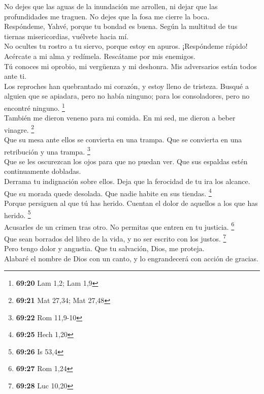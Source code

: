  No dejes que las aguas de la inundación me arrollen, ni
dejar que las profundidades me traguen. No dejes que la fosa me cierre
la boca.\\
 Respóndeme, Yahvé, porque tu bondad es buena. Según la
multitud de tus tiernas misericordias, vuélvete hacia mí.\\
 No ocultes tu rostro a tu siervo, porque estoy en
apuros. ¡Respóndeme rápido!\\
 Acércate a mi alma y redímela. Rescátame por mis
enemigos.\\
 Tú conoces mi oprobio, mi vergüenza y mi deshonra. Mis
adversarios están todos ante ti.\\
 Los reproches han quebrantado mi corazón, y estoy lleno
de tristeza. Busqué a alguien que se apiadara, pero no había ninguno;
para los consoladores, pero no encontré ninguno. \footnote{\textbf{69:20}
  Lam 1,2; Lam 1,9}\\
 También me dieron veneno para mi comida. En mi sed, me
dieron a beber vinagre. \footnote{\textbf{69:21} Mat 27,34; Mat 27,48}\\
 Que su mesa ante ellos se convierta en una trampa. Que
se convierta en una retribución y una trampa. \footnote{\textbf{69:22}
  Rom 11,9-10}\\
 Que se les oscurezcan los ojos para que no puedan ver.
Que sus espaldas estén continuamente dobladas.\\
 Derrama tu indignación sobre ellos. Deja que la
ferocidad de tu ira los alcance.\\
 Que su morada quede desolada. Que nadie habite en sus
tiendas. \footnote{\textbf{69:25} Hech 1,20}\\
 Porque persiguen al que tú has herido. Cuentan el dolor
de aquellos a los que has herido. \footnote{\textbf{69:26} Is 53,4}\\
 Acusarles de un crimen tras otro. No permitas que entren
en tu justicia. \footnote{\textbf{69:27} Rom 1,24}\\
 Que sean borrados del libro de la vida, y no ser escrito
con los justos. \footnote{\textbf{69:28} Luc 10,20}\\
 Pero tengo dolor y angustia. Que tu salvación, Dios, me
proteja.\\
 Alabaré el nombre de Dios con un canto, y lo
engrandecerá con acción de gracias.\\
